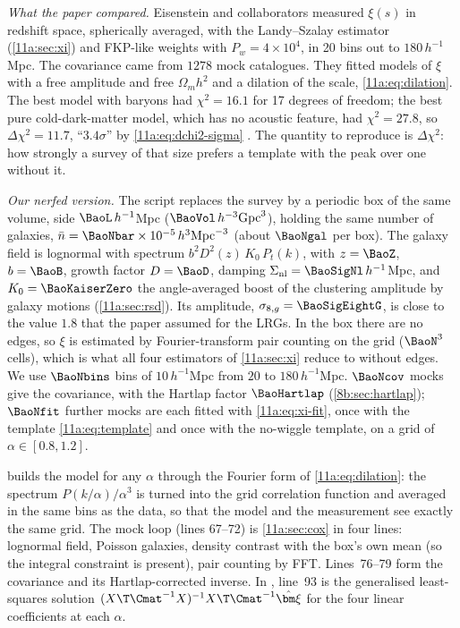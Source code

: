 \emph{What the paper compared.} Eisenstein and collaborators measured $\xi(s)$ in
redshift space, spherically averaged, with the Landy--Szalay estimator
(\cref{11a:sec:xi}) and FKP-like weights with $P_w=4\times10^4$, in 20 bins out to
$180\,h^{-1}$Mpc. The covariance came from $1278$ mock catalogues. They fitted
models of $\xi$ with a free amplitude and free $\Omega_mh^2$ and a dilation of the
scale, \eqref{11a:eq:dilation}. The best model with baryons had $\chi^2=16.1$ for
17 degrees of freedom; the best pure cold-dark-matter model, which has no acoustic
feature, had $\chi^2=27.8$, so $\Delta\chi^2=11.7$, ``$3.4\sigma$'' by
\eqref{11a:eq:dchi2-sigma} . The
quantity to reproduce is $\Delta\chi^2$: how strongly a survey of that size
prefers a template with the peak over one without it.

\emph{Our nerfed version.} The script  replaces
the survey by a periodic box of the same volume, side $\BaoL\,h^{-1}$Mpc
($\BaoVol\,h^{-3}\mathrm{Gpc}^3$), holding the same number of galaxies,
$\bar n=\BaoNbar\times10^{-5}\,h^3\mathrm{Mpc}^{-3}$ (about $\BaoNgal$ per box).
The galaxy field is lognormal with spectrum $b^2D^2(z)\,K_0\,P_t(k)$, with
$z=\BaoZ$, $b=\BaoB$, growth factor $D=\BaoD$, damping
$\Sigma_{\mathrm{nl}}=\BaoSigNl\,h^{-1}$Mpc, and $K_0=\BaoKaiserZero$ the
angle-averaged boost of the clustering amplitude by galaxy motions
(\cref{11a:sec:rsd}). Its amplitude, $\sigma_{8,g}=\BaoSigEightG$, is close to the
value $1.8$ that the paper assumed for the LRGs. In the box there are no edges, so
$\xi$ is estimated by Fourier-transform pair counting on the grid ($\BaoN^3$
cells), which is what all four estimators of \cref{11a:sec:xi} reduce to without
edges. We use $\BaoNbins$ bins of $10\,h^{-1}$Mpc from $20$ to $180\,h^{-1}$Mpc.
$\BaoNcov$ mocks give the covariance, with the Hartlap factor $\BaoHartlap$
(\cref{8b:sec:hartlap}); $\BaoNfit$ further mocks are each fitted with
\eqref{11a:eq:xi-fit}, once with the template \eqref{11a:eq:template} and once
with the no-wiggle template, on a grid of $\alpha\in[0.8,1.2]$.


 builds the model for any $\alpha$ through the Fourier form of
\eqref{11a:eq:dilation}: the spectrum $P(k/\alpha)/\alpha^3$ is turned into the
grid correlation function and averaged in the same bins as the data, so that the
model and the measurement see exactly the same grid. The mock loop (lines
67--72) is \cref{11a:sec:cox} in four lines: lognormal field, Poisson galaxies,
density contrast with the box's own mean (so the integral constraint is present),
pair counting by FFT. Lines~76--79 form the covariance and its Hartlap-corrected
inverse. In , line~93 is the generalised least-squares solution
$(X\T\Cmat^{-1}X)^{-1}X\T\Cmat^{-1}\hat{\bm\xi}$ for the four linear coefficients
at each $\alpha$.

